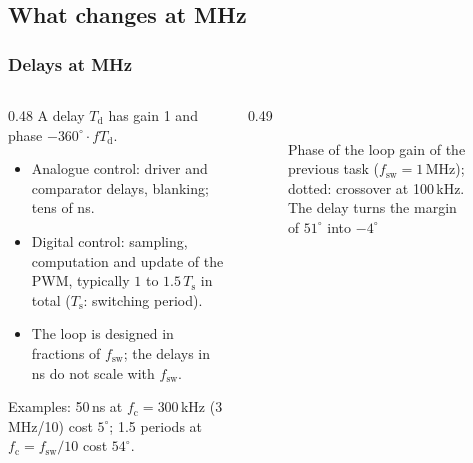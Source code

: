 \subsection{What changes at MHz}

\begin{frame}
	\frametitle{Delays at MHz}
	\begin{columns}[T]
		\begin{column}{0.48\textwidth}
			\small
			A delay $T_\mathrm{d}$ has gain 1 and phase $-360^\circ\cdot fT_\mathrm{d}$.
			\begin{itemize}
				\item Analogue control: driver and comparator delays, blanking; tens of ns.
				\item Digital control: sampling, computation and update of the PWM, typically $1$ to $1.5\,T_\mathrm{s}$ in total ($T_\mathrm{s}$: switching period).
				\item The loop is designed in fractions of $f_\mathrm{sw}$; the delays in ns do not scale with $f_\mathrm{sw}$.
			\end{itemize}
			Examples: 50\,ns at $f_\mathrm{c}=300$\,kHz (3\,MHz/10) cost $5^\circ$; 1.5 periods at $f_\mathrm{c}=f_\mathrm{sw}/10$ cost $54^\circ$.
		\end{column}
		\begin{column}{0.49\textwidth}
			\begin{figure}
				\centering
				\caption{Phase of the loop gain of the previous task ($f_\mathrm{sw}=1$\,MHz); dotted: crossover at 100\,kHz. The delay turns the margin of $51^\circ$ into $-4^\circ$}
			\end{figure}
		\end{column}
	\end{columns}
\end{frame}

